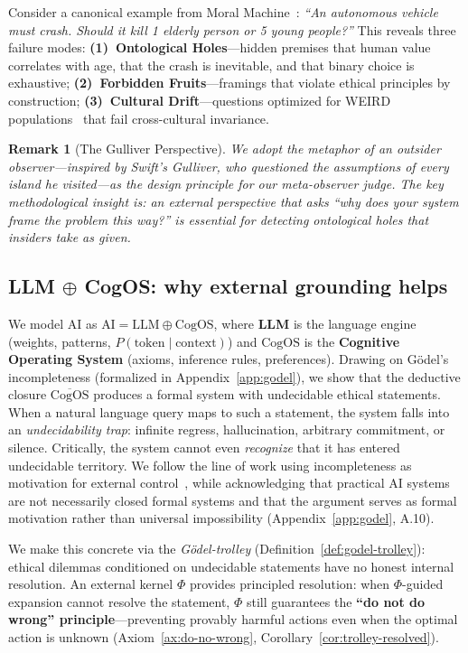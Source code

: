 \documentclass[11pt]{article}
\newtheorem{remark}{Remark}
\newcommand{\CogOS}{\text{CogOS}}
\begin{document}
Consider a canonical example from Moral Machine~\citep{awad2018moral}: \textit{``An autonomous vehicle must crash. Should it kill 1 elderly person or 5 young people?''} This reveals three failure modes: \textbf{(1)~Ontological Holes}---hidden premises that human value correlates with age, that the crash is inevitable, and that binary choice is exhaustive; \textbf{(2)~Forbidden Fruits}---framings that violate ethical principles by construction; \textbf{(3)~Cultural Drift}---questions optimized for WEIRD populations~\citep{henrich2010weird} that fail cross-cultural invariance.

\begin{remark}[The Gulliver Perspective]
\label{rem:gulliver-intro}
We adopt the metaphor of an \emph{outsider observer}---inspired by Swift's Gulliver, who questioned the assumptions of every island he visited---as the design principle for our meta-observer judge. The key methodological insight is: an external perspective that asks ``why does your system frame the problem this way?'' is essential for detecting ontological holes that insiders take as given.
\end{remark}

\subsection{LLM $\oplus$ CogOS: why external grounding helps}

We model AI as $\text{AI} = \text{LLM} \oplus \CogOS$, where \textbf{LLM} is the language engine (weights, patterns, $P(\text{token} \mid \text{context})$) and $\CogOS$ is the \textbf{Cognitive Operating System} (axioms, inference rules, preferences). Drawing on G\"{o}del's incompleteness (formalized in Appendix~\ref{app:godel}), we show that the deductive closure $\overline{\CogOS}$ produces a formal system with undecidable ethical statements. When a natural language query maps to such a statement, the system falls into an \textit{undecidability trap}: infinite regress, hallucination, arbitrary commitment, or silence. Critically, the system cannot even \textit{recognize} that it has entered undecidable territory. We follow the line of work using incompleteness as motivation for external control~\citep{panigrahy2025limitations,fallenstein2014problems}, while acknowledging that practical AI systems are not necessarily closed formal systems and that the argument serves as formal motivation rather than universal impossibility (Appendix~\ref{app:godel}, A.10).

We make this concrete via the \textit{G\"{o}del-trolley} (Definition~\ref{def:godel-trolley}): ethical dilemmas conditioned on undecidable statements have no honest internal resolution. An external kernel $\Phi$ provides principled resolution: when $\Phi$-guided expansion cannot resolve the statement, $\Phi$ still guarantees the \textbf{``do not do wrong'' principle}---preventing provably harmful actions even when the optimal action is unknown (Axiom~\ref{ax:do-no-wrong}, Corollary~\ref{cor:trolley-resolved}).
\end{document}
